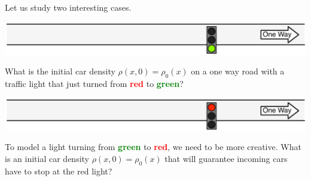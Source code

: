 \begin{slide}
\question

Let us study two interesting cases.

\begin{parts}
\item[]
\begin{center}
\includegraphics[width=.6\textwidth]{images/road-green.pdf}	
\end{center}


\item What is the initial car density $\rho(x,0) = \rho_0(x)$ on a one way road with a traffic light that just turned from \textbf{\textcolor{red}{red}} to \textbf{\textcolor{green}{green}}?


\begin{center}
\includegraphics[width=.6\textwidth]{images/road-red.pdf}	
\end{center}


\item To model a light turning from \textbf{\textcolor{green}{green}} to \textbf{\textcolor{red}{red}}, we need to be more creative. What is an initial car density $\rho(x,0) = \rho_0(x)$ that will guarantee incoming cars have to stop at the red light?

	
\end{parts}
	
\end{slide}





